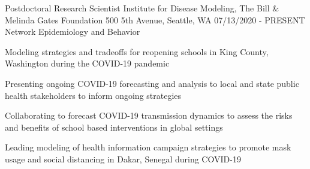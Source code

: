 \vspace{-2mm}


\begin{cventries}
  \cventry
    {Postdoctoral Research Scientist} %
    {Institute for Disease Modeling, The Bill \& Melinda Gates Foundation} %
    {500 5th Avenue, Seattle, WA
    } %
    {07/13/2020 - PRESENT} %
    {Network Epidemiology and Behavior} %
    {
      \begin{cvitems} %
        \item {
        Modeling strategies and tradeoffs for reopening schools in King County, Washington during the COVID-19 pandemic
        }
        \item {Presenting ongoing COVID-19 forecasting and analysis to local and state public health stakeholders to inform ongoing strategies}
        \item {Collaborating to forecast COVID-19 transmission dynamics to assess the risks and benefits of school based interventions in global settings 
        }
        \item {Leading modeling of health information campaign strategies to promote mask usage and social distancing in Dakar, Senegal during COVID-19}

\end{cvitems}}
\end{cventries}
